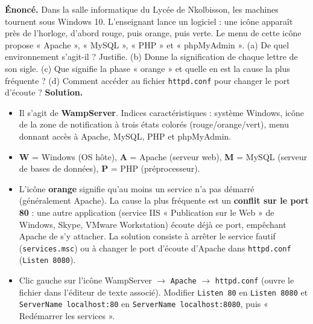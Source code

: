 \documentclass[11pt]{article}
\begin{document}
\begin{exoresolu}
\textbf{Énoncé.} Dans la salle informatique du Lycée de Nkolbisson, les machines tournent sous Windows 10. L'enseignant lance un logiciel : une icône apparaît près de l'horloge, d'abord rouge, puis orange, puis verte. Le menu de cette icône propose « Apache », « MySQL », « PHP » et « phpMyAdmin ». (a) De quel environnement s'agit-il ? Justifie. (b) Donne la signification de chaque lettre de son sigle. (c) Que signifie la phase « orange » et quelle en est la cause la plus fréquente ? (d) Comment accéder au fichier \texttt{httpd.conf} pour changer le port d'écoute ?
\tcblower
\textbf{Solution.}
\begin{itemize}
\item[(a)] Il s'agit de \textbf{WampServer}. Indices caractéristiques : système Windows, icône de la zone de notification à trois états colorés (rouge/orange/vert), menu donnant accès à Apache, MySQL, PHP et phpMyAdmin.
\item[(b)] \textbf{W} = Windows (OS hôte), \textbf{A} = Apache (serveur web), \textbf{M} = MySQL (serveur de bases de données), \textbf{P} = PHP (préprocesseur).
\item[(c)] L'icône \textbf{orange} signifie qu'au moins un service n'a pas démarré (généralement Apache). La cause la plus fréquente est un \textbf{conflit sur le port 80} : une autre application (service IIS « Publication sur le Web » de Windows, Skype, VMware Workstation) écoute déjà ce port, empêchant Apache de s'y attacher. La solution consiste à arrêter le service fautif (\texttt{services.msc}) ou à changer le port d'écoute d'Apache dans \texttt{httpd.conf} (\texttt{Listen 8080}).
\item[(d)] Clic gauche sur l'icône WampServer $\rightarrow$ \texttt{Apache} $\rightarrow$ \texttt{httpd.conf} (ouvre le fichier dans l'éditeur de texte associé). Modifier \texttt{Listen 80} en \texttt{Listen 8080} et \texttt{ServerName localhost:80} en \texttt{ServerName localhost:8080}, puis « Redémarrer les services ».
\end{itemize}
\end{exoresolu}
\end{document}
